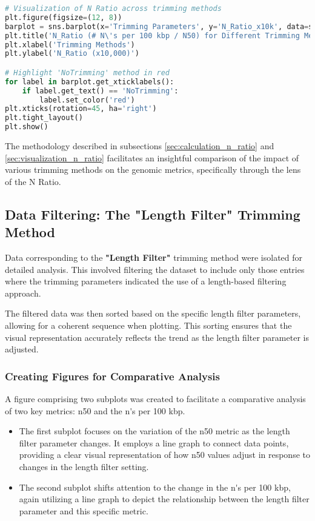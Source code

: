 \begin{lstlisting}[language=Python, label={lst:n_ratio_visual}, caption=Visualization of the "N Ratio"]
# Visualization of N Ratio across trimming methods
plt.figure(figsize=(12, 8))
barplot = sns.barplot(x='Trimming Parameters', y='N_Ratio_x10k', data=sorted_df)
plt.title('N_Ratio (# N\'s per 100 kbp / N50) for Different Trimming Methods (Values x10,000)')
plt.xlabel('Trimming Methods')
plt.ylabel('N_Ratio (x10,000)')

# Highlight 'NoTrimming' method in red
for label in barplot.get_xticklabels():
    if label.get_text() == 'NoTrimming':
        label.set_color('red')
plt.xticks(rotation=45, ha='right')
plt.tight_layout()
plt.show()
\end{lstlisting}


The methodology described in subsections \ref{sec:calculation_n_ratio} and \ref{sec:visualization_n_ratio} facilitates an insightful comparison of the impact of various \gls{trimming} methods on the genomic \gls{metrics}, specifically through the lens of the N Ratio.



\subsection{Data Filtering: The "Length Filter" Trimming Method} \label{sec:length_filter_trimming}
Data corresponding to the \textbf{"Length Filter"} \gls{trimming} method were isolated for detailed analysis. This involved filtering the dataset to include only those entries where the \gls{trimming} parameters indicated the use of a length-based filtering approach.

The filtered data was then sorted based on the specific length filter parameters, allowing for a coherent sequence when plotting. This sorting ensures that the visual representation accurately reflects the trend as the length filter parameter is adjusted.

\subsubsection{Creating Figures for Comparative Analysis}
A figure comprising two subplots was created to facilitate a comparative analysis of two key metrics: \gls{n50} and the \gls{n's per 100 kbp}. 

\begin{itemize}
    \item The first subplot focuses on the variation of the \gls{n50} metric as the length filter parameter changes. It employs a line graph to connect data points, providing a clear visual representation of how \gls{n50} values adjust in response to changes in the length filter setting.
    \item The second subplot shifts attention to the change in the \gls{n's per 100 kbp}, again utilizing a line graph to depict the relationship between the length filter parameter and this specific metric.
\end{itemize}


